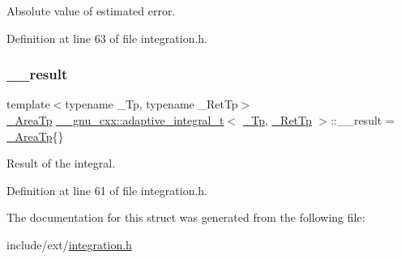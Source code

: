 Absolute value of estimated error. 



Definition at line 63 of file integration.\+h.

\mbox{\label{struct____gnu__cxx_1_1adaptive__integral__t_ab868081e535832031b0e75d0e4d0197d}} 
\subsubsection{\texorpdfstring{\+\_\+\+\_\+result}{\_\_result}}
{\footnotesize\ttfamily template$<$typename \+\_\+\+Tp, typename \+\_\+\+Ret\+Tp$>$ \\
\hyperlink{struct____gnu__cxx_1_1adaptive__integral__t_a9371ae517b6bff468e44130718d90f8b}{\+\_\+\+Area\+Tp} \hyperlink{struct____gnu__cxx_1_1adaptive__integral__t}{\+\_\+\+\_\+gnu\+\_\+cxx\+::adaptive\+\_\+integral\+\_\+t}$<$ \hyperlink{namespace____gnu__cxx_a3b19a9c800ca194374ef9172290f7d79}{\+\_\+\+Tp}, \hyperlink{namespace____gnu__cxx_a886e03ece3d53ff7fa6c098a40f93fa5}{\+\_\+\+Ret\+Tp} $>$\+::\+\_\+\+\_\+result = \hyperlink{struct____gnu__cxx_1_1adaptive__integral__t_a9371ae517b6bff468e44130718d90f8b}{\+\_\+\+Area\+Tp}\{\}}



Result of the integral. 



Definition at line 61 of file integration.\+h.



The documentation for this struct was generated from the following file\+:\begin{DoxyCompactItemize}
\item 
include/ext/\hyperlink{integration_8h}{integration.\+h}\end{DoxyCompactItemize}
